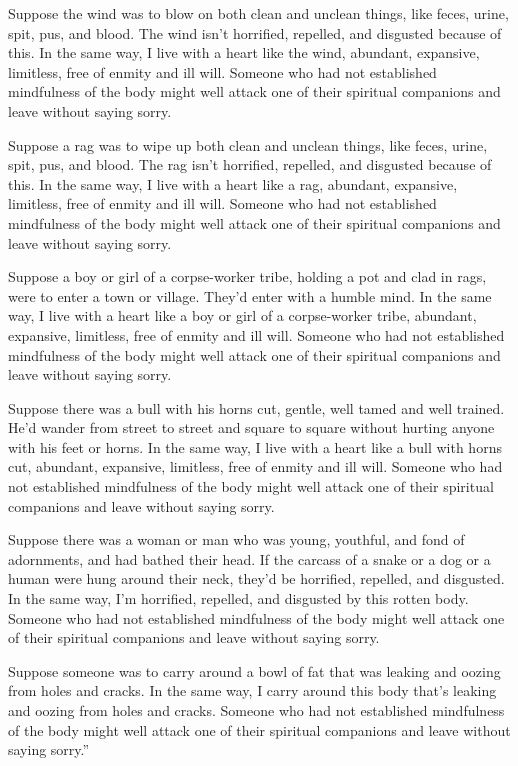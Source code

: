 \documentclass[12pt,openany]{book}%
\begin{document}
Suppose the wind was to blow on both clean and unclean things, like feces, urine, spit, pus, and blood. The wind isn’t horrified, repelled, and disgusted because of this. In the same way, I live with a heart like the wind, abundant, expansive, limitless, free of enmity and ill will. Someone who had not established mindfulness of the body might well attack one of their spiritual companions and leave without saying sorry. 

Suppose a rag was to wipe up both clean and unclean things, like feces, urine, spit, pus, and blood. The rag isn’t horrified, repelled, and disgusted because of this. In the same way, I live with a heart like a rag, abundant, expansive, limitless, free of enmity and ill will. Someone who had not established mindfulness of the body might well attack one of their spiritual companions and leave without saying sorry. 

Suppose a boy or girl of a corpse-worker tribe, holding a pot and clad in rags, were to enter a town or village. They’d enter with a humble mind. In the same way, I live with a heart like a boy or girl of a corpse-worker tribe, abundant, expansive, limitless, free of enmity and ill will. Someone who had not established mindfulness of the body might well attack one of their spiritual companions and leave without saying sorry. 

Suppose there was a bull with his horns cut, gentle, well tamed and well trained. He’d wander from street to street and square to square without hurting anyone with his feet or horns. In the same way, I live with a heart like a bull with horns cut, abundant, expansive, limitless, free of enmity and ill will. Someone who had not established mindfulness of the body might well attack one of their spiritual companions and leave without saying sorry. 

Suppose there was a woman or man who was young, youthful, and fond of adornments, and had bathed their head. If the carcass of a snake or a dog or a human were hung around their neck, they’d be horrified, repelled, and disgusted. In the same way, I’m horrified, repelled, and disgusted by this rotten body. Someone who had not established mindfulness of the body might well attack one of their spiritual companions and leave without saying sorry. 

Suppose someone was to carry around a bowl of fat that was leaking and oozing from holes and cracks. In the same way, I carry around this body that’s leaking and oozing from holes and cracks. Someone who had not established mindfulness of the body might well attack one of their spiritual companions and leave without saying sorry.” 
\end{document}
